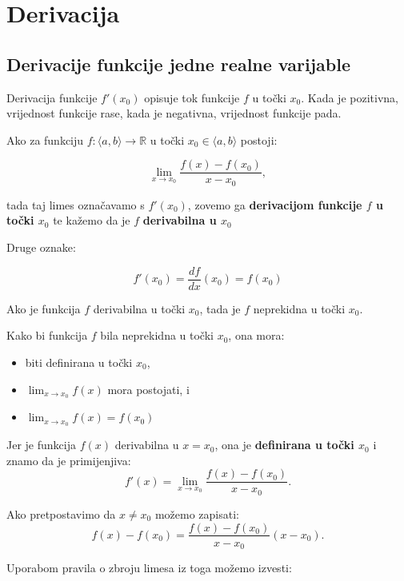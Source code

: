\section{Derivacija}
\subsection{Derivacije funkcije jedne realne varijable}

Derivacija funkcije $f'(x_0)$ opisuje tok funkcije $f$ u točki $x_0$. Kada je
pozitivna, vrijednost funkcije rase, kada je negativna, vrijednost funkcije pada.

\begin{definition}
    \label{def:diff}
    Ako za funkciju $f:\langle a,b\rangle \to \mathbb{R}$ u točki $x_0\in\langle a,b\rangle$ postoji:

    $$
        \lim_{x\to x_0} \frac{f(x) - f(x_0)}{x-x_0},
    $$

    tada taj limes označavamo s $f'(x_0)$, zovemo ga \textbf{derivacijom funkcije $f$ u točki $x_0$}
    te kažemo da je $f$ \textbf{derivabilna u $x_0$}
\end{definition}

Druge oznake:

$$
f'(x_0) = \frac{df}{dx}(x_0) = f(x_0)
$$

\begin{propositionbox}
    Ako je funkcija $f$ derivabilna u točki $x_0$, tada je $f$ neprekidna u točki $x_0$.
\end{propositionbox}

Kako bi funkcija $f$ bila neprekidna u točki $x_0$, ona mora:
\begin{itemize}
    \item biti definirana u točki $x_0$,
    \item $\lim_{x\to x_0}f(x)$ mora postojati, i
    \item $\lim_{x\to x_0}f(x) = f(x_0)$
\end{itemize}

Jer je funkcija $f(x)$ derivabilna u $x=x_0$, ona je \textbf{definirana u točki $x_0$} i znamo da je  primijenjiva:
$$
f'(x) = \lim_{x\to x_0} \frac{f(x) - f(x_0)}{x-x_0}.
$$

Ako pretpostavimo da $x\neq x_0$ možemo zapisati:
$$
f(x) - f(x_0) = \frac{f(x)-f(x_0)}{x-x_0}(x-x_0).
$$

Uporabom pravila o zbroju limesa iz toga možemo izvesti:

